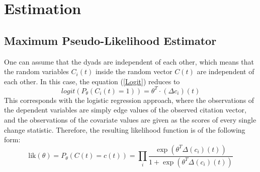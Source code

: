 \documentclass[headsepline=true, abstracton]{scrartcl}
\begin{document}
\section*{Estimation}

\subsection*{Maximum Pseudo-Likelihood Estimator}
One can assume that the dyads are independent of each other, which means that
the random variables $C_i(t)$ inside the random vector $C(t)$ are independent of each other.
In this case, the equation (\ref{Logit}) reduces to
$$logit(P_{\theta}(C_i(t) = 1)) = \theta^T \cdot (\Delta c_i)(t)$$
This corresponds with the logistic regression approach, where the observations of
the dependent variables are simply edge values of the observed citation vector,
and the observations of the covariate values are given as the scores of every single
change statistic. Therefore, the resulting likelihood function is of the following form:
\begin{equation}
\text{lik}(\theta)= P_{\theta}(C(t)=c(t))= \prod_{i} \dfrac{ \exp \left(\theta^T \Delta(c_i)(t) \right)}{1+\exp \left(\theta^T \Delta(c_i)(t) \right)}
\label{PseudoLik}
\end{equation}
\end{document}
